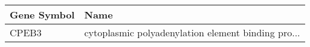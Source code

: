 \begin{tabular}{ll}
\toprule
Gene Symbol &                                               Name \\
\midrule
      CPEB3 & cytoplasmic polyadenylation element binding pro... \\
\bottomrule
\end{tabular}
